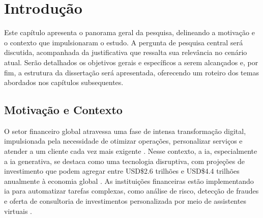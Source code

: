 \newcommand{\chaptertitle}{}
\let\oldchapter\chapter
\renewcommand{\chapter}[1]{%
  \renewcommand{\chaptertitle}{#1}%
  \oldchapter{#1}%
}
\chapter{Introdução}

Este capítulo apresenta o panorama geral da pesquisa, delineando a motivação e o contexto que impulsionaram o estudo. A pergunta de pesquisa central será discutida, acompanhada da justificativa que ressalta sua relevância no cenário atual. Serão detalhados os objetivos gerais e específicos a serem alcançados e, por fim, a estrutura da dissertação será apresentada, oferecendo um roteiro dos temas abordados nos capítulos subsequentes.

\section{Motivação e Contexto}

O setor financeiro global atravessa uma fase de intensa transformação digital, impulsionada pela necessidade de otimizar operações, personalizar serviços e atender a um cliente cada vez mais exigente \cite{finn_what_2024}. Nesse contexto, a \gls{ia}, especialmente a \gls{ia} generativa, se destaca como uma tecnologia disruptiva, com projeções de investimento que podem agregar entre USD\$2.6 trilhões e USD\$4.4 trilhões anualmente à economia global \cite{mckinsey_economic_2023}. As instituições financeiras estão implementando \gls{ia} para automatizar tarefas complexas, como análise de risco, detecção de fraudes e oferta de consultoria de investimentos personalizada por meio de assistentes virtuais \cite{finn_what_2024}.

